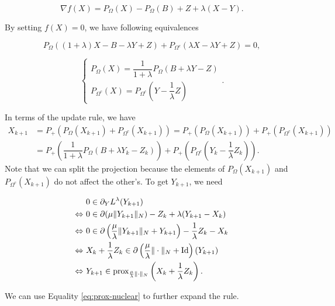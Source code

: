 \begin{enumerate}
        $$\nabla f(X) = P_\Omega(X) - P_\Omega(B) + Z + \lambda(X-Y).$$

        By setting $f(X) = 0$, we have following equivalences

        $$P_{\Omega}((1+\lambda)X - B - \lambda Y + Z) + P_{\Omega^c}(\lambda X - \lambda Y + Z) = 0,$$

        $$\begin{cases}
            P_{\Omega}(X) = \dfrac{1}{1+\lambda} P_{\Omega}(B+\lambda Y - Z) \\
            P_{\Omega^c}(X) = P_{\Omega^c}\left(Y - \dfrac{1}{\lambda}Z\right)
          \end{cases}.
        $$

        In terms of the update rule, we have
        \begin{align*}
          X_{k+1}
           & = P_+(P_{\Omega}(X_{k+1}) + P_{\Omega^c}(X_{k+1})) = P_+(P_{\Omega}(X_{k+1})) + P_+(P_{\Omega^c}(X_{k+1}))                                      \\
           & = P_+\left(\dfrac{1}{1+\lambda} P_{\Omega}(B+\lambda Y_k - Z_k)\right) + P_+\left( P_{\Omega^c}\left(Y_k - \dfrac{1}{\lambda}Z_k\right)\right).
        \end{align*}
        Note that we can split the projection because the elements of $P_{\Omega}(X_{k+1})$ and $P_{\Omega^c}(X_{k+1})$ do not affect the other's. To get $Y_{k+1}$, we need

        \begin{align*}
                              & 0\in \partial_YL^\lambda(Y_{k+1})                                                                           \\
          \Leftrightarrow\,\, & 0\in \partial(\mu\|Y_{k+1}\|_N) - Z_k + \lambda(Y_{k+1} - X_k)                                              \\
          \Leftrightarrow\,\, & 0\in \partial\left(\dfrac{\mu}{\lambda}\|Y_{k+1}\|_N + Y_{k+1}\right) - \dfrac{1}{\lambda}Z_k - X_k         \\
          \Leftrightarrow\,\, & X_k + \dfrac{1}{\lambda}Z_k \in \partial\left(\dfrac{\mu}{\lambda}\|\cdot\|_N + \mathrm{Id}\right)(Y_{k+1}) \\
          \Leftrightarrow\,\, & Y_{k+1} \in \mathrm{prox}_{\frac{\mu}{\lambda}\|\cdot\|_N}\left(X_k + \dfrac{1}{\lambda}Z_k\right).
        \end{align*}

        We can use Equality \ref{eq:prox-nuclear} to further expand the rule.


\end{enumerate}